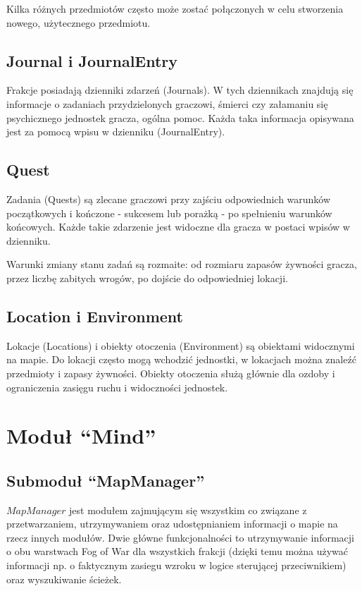 \documentclass[licencjacka]{pracamgr}
\begin{document}
      Kilka różnych przedmiotów często może zostać połączonych w celu stworzenia nowego, użytecznego przedmiotu.

    \subsection{Journal i JournalEntry}
      Frakcje posiadają dzienniki zdarzeń (Journals). W tych dziennikach znajdują się informacje o zadaniach
      przydzielonych graczowi, śmierci czy załamaniu się psychicznego jednostek gracza, ogólna pomoc. Każda taka
      informacja opisywana jest za pomocą wpisu w dzienniku (JournalEntry).

    \subsection{Quest}
      Zadania (Quests) są zlecane graczowi przy zajściu odpowiednich warunków początkowych i kończone - sukcesem lub
      porażką - po spełnieniu warunków końcowych. Każde takie zdarzenie jest widoczne dla gracza w postaci wpisów w
      dzienniku.

      Warunki zmiany stanu zadań są rozmaite: od rozmiaru zapasów żywności gracza, przez liczbę zabitych wrogów, po
      dojście do odpowiedniej lokacji.

    \subsection{Location i Environment}
      Lokacje (Locations) i obiekty otoczenia (Environment) są obiektami widocznymi na mapie. Do lokacji często mogą
      wchodzić jednostki, w lokacjach można znaleźć przedmioty i zapasy żywności. Obiekty otoczenia służą głównie dla
      ozdoby i ograniczenia zasięgu ruchu i widoczności jednostek.

  \section{Moduł ``Mind''}
    \subsection{Submoduł ``MapManager''}
    $MapManager$ jest modułem zajmującym się wszystkim co związane z przetwarzaniem, utrzymywaniem oraz udostępnianiem
    informacji o mapie na rzecz innych modułów. Dwie główne funkcjonalności to utrzymywanie informacji o obu warstwach
    Fog of War dla wszystkich frakcji (dzięki temu można używać informacji np. o faktycznym zasiegu wzroku w logice
    sterującej przeciwnikiem) oraz wyszukiwanie ścieżek.
\end{document}
